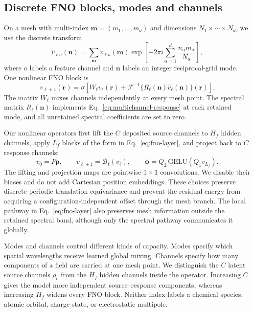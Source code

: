 \documentclass[11pt]{article}
\begin{document}
\subsection{Discrete FNO blocks, modes and channels}

On a mesh with multi-index \(\mathbf m=(m_1,\ldots,m_d)\) and dimensions
\(N_1\times\cdots\times N_d\), we use the discrete transform
\begin{equation}
 \widehat v_{\ell a}(\mathbf n)
 =\sum_{\mathbf m}v_{\ell a}(\mathbf m)
 \exp\!\left[-2\pi i\sum_{\alpha=1}^{d}
 \frac{n_\alpha m_\alpha}{N_\alpha}\right],
 \label{eq:discrete-fourier}
\end{equation}
where \(a\) labels a feature channel and \(\mathbf n\) labels an integer
reciprocal-grid mode. One nonlinear FNO block is
\begin{equation}
 v_{\ell+1}(\mathbf r)=\sigma\!\left[
 W_\ell v_\ell(\mathbf r)+
 \mathcal F^{-1}\{R_\ell(\mathbf n)\widehat v_\ell(\mathbf n)\}(\mathbf r)
 \right].
 \label{eq:fno-layer}
\end{equation}
The matrix \(W_\ell\) mixes channels independently at every mesh point. The
spectral matrix \(R_\ell(\mathbf n)\) implements
Eq.~\eqref{eq:multichannel-response} at each retained mode, and all unretained
spectral coefficients are set to zero.

Our nonlinear operators first lift the \(C\) deposited source channels to
\(H_f\) hidden channels, apply \(L_f\) blocks of the form in
Eq.~\eqref{eq:fno-layer}, and project back to \(C\) response channels:
\begin{equation}
 v_0=P\boldsymbol\rho,\qquad
 v_{\ell+1}=\mathcal B_\ell(v_\ell),\qquad
 \boldsymbol\phi=Q_2\,\mathrm{GELU}(Q_1v_{L_f}).
 \label{eq:fno-stack}
\end{equation}
The lifting and projection maps are pointwise \(1\times1\) convolutions. We
disable their biases and do not add Cartesian position embeddings. These
choices preserve discrete periodic translation equivariance and prevent the
residual energy from acquiring a configuration-independent offset through
the mesh branch. The local pathway in Eq.~\eqref{eq:fno-layer} also preserves
mesh information outside the retained spectral band, although only the
spectral pathway communicates it globally.

Modes and channels control different kinds of capacity. Modes specify which
spatial wavelengths receive learned global mixing. Channels specify how many
components of a field are carried at one mesh point. We distinguish the
\(C\) latent source channels \(\rho_c\) from the \(H_f\) hidden channels
inside the operator. Increasing \(C\) gives the model more independent
source--response components, whereas increasing \(H_f\) widens every FNO
block. Neither index labels a chemical species, atomic orbital, charge state,
or electrostatic multipole.
\end{document}
